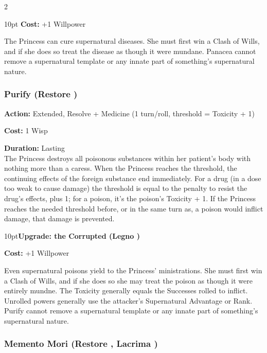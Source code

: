 \begin{multicols}{2}
\begin{myindentpar}{10pt}
\noindent \textbf{Cost:} +1 Willpower

The Princess can cure supernatural diseases.  She must first win a Clash of Wills, and if she does so treat the disease as though it were mundane. Panacea cannot remove a supernatural template or any innate part of something's supernatural nature.\end{myindentpar}

\subsubsection*{Purify (Restore \textbullet\textbullet)}

\noindent \textbf{Action:} Extended, Resolve + Medicine (1 turn/roll, threshold = Toxicity + 1)

\noindent \textbf{Cost:} 1 Wisp

\noindent \textbf{Duration:} Lasting \\

\noindent The Princess destroys all poisonous substances within her patient's body with nothing more than a caress. When the Princess reaches the threshold, the continuing effects of the foreign substance end immediately. For a drug (in a dose too weak to cause damage) the threshold is equal to the penalty to resist the drug's effects, plus 1; for a poison, it's the poison's Toxicity + 1. If the Princess reaches the needed threshold before, or in the same turn as, a poison would inflict damage, that damage is prevented.

\begin{myindentpar}{10pt}\textbf{Upgrade: the Corrupted (Legno  \textbullet\textbullet\textbullet)}

\noindent \textbf{Cost:} +1 Willpower

Even supernatural poisons yield to the Princess' ministrations. She must first win a Clash of Wills, and if she does so she may treat the poison as though it were entirely mundne. The Toxicity generally equals the Successes rolled to inflict. Unrolled powers generally use the attacker's Supernatural Advantage or Rank. Purify cannot remove a supernatural template or any innate part of something's supernatural nature.\end{myindentpar}

\subsubsection*{Memento Mori (Restore \textbullet\textbullet, Lacrima \textbullet)}


\end{multicols}
